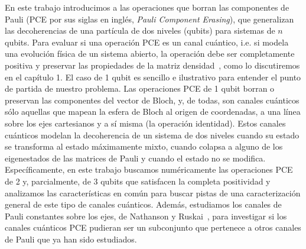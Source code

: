 En este trabajo introducimos a las operaciones que borran
las componentes de Pauli (PCE por sus siglas en inglés,
\textit{Pauli Component Erasing}), que generalizan las decoherencias de una
partícula de dos niveles (qubits) para sistemas de $n$ qubits.  Para evaluar si
una operación PCE es un canal cuántico, i.e. si modela una evolución física de
un sistema abierto, la operación debe ser completamente positiva y preservar
las propiedades de la matriz densidad~\citep{bengtsson_zyczkowski_2017},
como lo discutiremos en el capítulo 1.  El
caso de 1 qubit es sencillo e ilustrativo para entender el punto de partida de
nuestro problema.  Las operaciones PCE de 1 qubit borran o preservan las
componentes del vector de Bloch, y, de todas, son canales cuánticos sólo
aquellas que mapean la esfera de Bloch al origen de coordenadas, a una línea
sobre los ejes cartesianos y a sí misma (la operación identidad). Estos canales
cuánticos modelan la decoherencia de un sistema de dos niveles cuando su estado
se transforma al estado máximamente mixto, cuando colapsa a alguno de los
eigenestados de las matrices de Pauli y cuando el estado no se modifica.
Específicamente, en este trabajo buscamos numéricamente las operaciones PCE de
2 y, parcialmente, de 3 qubits que satisfacen la completa positividad y
analizamos las características en común para buscar pistas de una
caracterización general de este tipo de canales cuánticos. Además, estudiamos
los canales de Pauli constantes sobre los ejes, de Nathanson y
Ruskai~\cite{nathanson2007pauli}, para investigar si los canales cuánticos PCE
pudieran ser un subconjunto que pertenece a otros canales de Pauli que ya han
sido estudiados. 



